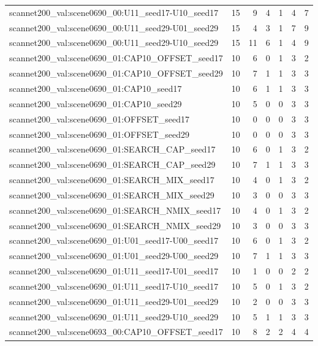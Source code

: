 \begin{table}[t]
\begin{tabular}{lrrrrrr}
scannet200\_val:scene0690\_00:U11\_seed17-U10\_seed17 & 15 & 9 & 4 & 1 & 4 & 7 \\
scannet200\_val:scene0690\_00:U11\_seed29-U01\_seed29 & 15 & 4 & 3 & 1 & 7 & 9 \\
scannet200\_val:scene0690\_00:U11\_seed29-U10\_seed29 & 15 & 11 & 6 & 1 & 4 & 9 \\
scannet200\_val:scene0690\_01:CAP10\_OFFSET\_seed17 & 10 & 6 & 0 & 1 & 3 & 2 \\
scannet200\_val:scene0690\_01:CAP10\_OFFSET\_seed29 & 10 & 7 & 1 & 1 & 3 & 3 \\
scannet200\_val:scene0690\_01:CAP10\_seed17 & 10 & 6 & 1 & 1 & 3 & 3 \\
scannet200\_val:scene0690\_01:CAP10\_seed29 & 10 & 5 & 0 & 0 & 3 & 3 \\
scannet200\_val:scene0690\_01:OFFSET\_seed17 & 10 & 0 & 0 & 0 & 3 & 3 \\
scannet200\_val:scene0690\_01:OFFSET\_seed29 & 10 & 0 & 0 & 0 & 3 & 3 \\
scannet200\_val:scene0690\_01:SEARCH\_CAP\_seed17 & 10 & 6 & 0 & 1 & 3 & 2 \\
scannet200\_val:scene0690\_01:SEARCH\_CAP\_seed29 & 10 & 7 & 1 & 1 & 3 & 3 \\
scannet200\_val:scene0690\_01:SEARCH\_MIX\_seed17 & 10 & 4 & 0 & 1 & 3 & 2 \\
scannet200\_val:scene0690\_01:SEARCH\_MIX\_seed29 & 10 & 3 & 0 & 0 & 3 & 3 \\
scannet200\_val:scene0690\_01:SEARCH\_NMIX\_seed17 & 10 & 4 & 0 & 1 & 3 & 2 \\
scannet200\_val:scene0690\_01:SEARCH\_NMIX\_seed29 & 10 & 3 & 0 & 0 & 3 & 3 \\
scannet200\_val:scene0690\_01:U01\_seed17-U00\_seed17 & 10 & 6 & 0 & 1 & 3 & 2 \\
scannet200\_val:scene0690\_01:U01\_seed29-U00\_seed29 & 10 & 7 & 1 & 1 & 3 & 3 \\
scannet200\_val:scene0690\_01:U11\_seed17-U01\_seed17 & 10 & 1 & 0 & 0 & 2 & 2 \\
scannet200\_val:scene0690\_01:U11\_seed17-U10\_seed17 & 10 & 5 & 0 & 1 & 3 & 2 \\
scannet200\_val:scene0690\_01:U11\_seed29-U01\_seed29 & 10 & 2 & 0 & 0 & 3 & 3 \\
scannet200\_val:scene0690\_01:U11\_seed29-U10\_seed29 & 10 & 5 & 1 & 1 & 3 & 3 \\
scannet200\_val:scene0693\_00:CAP10\_OFFSET\_seed17 & 10 & 8 & 2 & 2 & 4 & 4 \\

\end{tabular}
\end{table}
